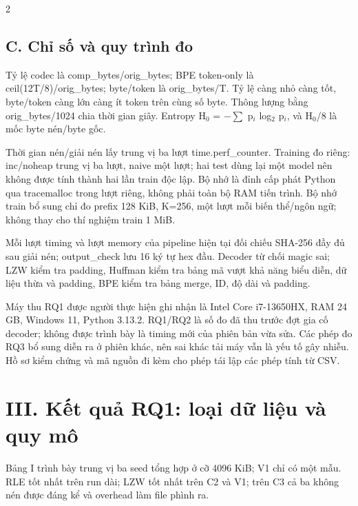 \documentclass[10pt,letterpaper]{article}
\begin{document}
\begin{multicols}{2}
\subsection*{C. Chỉ số và quy trình đo}
Tỷ lệ codec là comp\_\allowbreak{}bytes/\allowbreak{}orig\_\allowbreak{}bytes; BPE token-{}only là ceil(12T/\allowbreak{}8)/\allowbreak{}orig\_\allowbreak{}bytes; byte/\allowbreak{}token là orig\_\allowbreak{}bytes/\allowbreak{}T. Tỷ lệ càng nhỏ càng tốt, byte/\allowbreak{}token càng lớn càng ít token trên cùng số byte. Thông lượng bằng orig\_\allowbreak{}bytes/\allowbreak{}1024 chia thời gian giây. Entropy H\ensuremath{{}_0} = \ensuremath{-}\ensuremath{\sum} p\ensuremath{{}_i} log\ensuremath{{}_2} p\ensuremath{{}_i}, và H\ensuremath{{}_0}/\allowbreak{}8 là mốc byte nén/\allowbreak{}byte gốc.

Thời gian nén/\allowbreak{}giải nén lấy trung vị ba lượt time.perf\_\allowbreak{}counter. Training đo riêng: inc/\allowbreak{}noheap trung vị ba lượt, naive một lượt; hai test dùng lại một model nên không được tính thành hai lần train độc lập. Bộ nhớ là đỉnh cấp phát Python qua tracemalloc trong lượt riêng, không phải toàn bộ RAM tiến trình. Bộ nhớ train bổ sung chỉ đo prefix 128 KiB, K=256, một lượt mỗi biến thể/\allowbreak{}ngôn ngữ; không thay cho thí nghiệm train 1 MiB.

Mỗi lượt timing và lượt memory của pipeline hiện tại đối chiếu SHA-{}256 đầy đủ sau giải nén; output\_\allowbreak{}check lưu 16 ký tự hex đầu. Decoder từ chối magic sai; LZW kiểm tra padding, Huffman kiểm tra bảng mã vượt khả năng biểu diễn, dữ liệu thừa và padding, BPE kiểm tra bảng merge, ID, độ dài và padding.

Máy thu RQ1 được người thực hiện ghi nhận là Intel Core i7-{}13650HX, RAM 24 GB, Windows 11, Python 3.13.2. RQ1/\allowbreak{}RQ2 là số đo đã thu trước đợt gia cố decoder; không được trình bày là timing mới của phiên bản vừa sửa. Các phép đo RQ3 bổ sung diễn ra ở phiên khác, nên sai khác tải máy vẫn là yếu tố gây nhiễu. Hồ sơ kiểm chứng và mã nguồn đi kèm cho phép tái lập các phép tính từ CSV.

\section*{III. Kết quả RQ1: loại dữ liệu và quy mô}
Bảng I trình bày trung vị ba seed tổng hợp ở cỡ 4096 KiB; V1 chỉ có một mẫu. RLE tốt nhất trên run dài; LZW tốt nhất trên C2 và V1; trên C3 cả ba không nén được đáng kể và overhead làm file phình ra.

\end{multicols}
\end{document}
